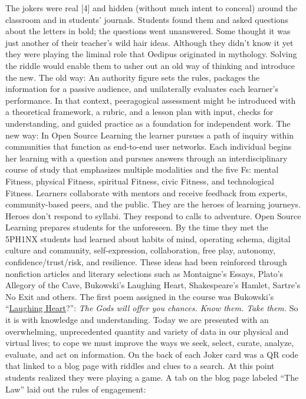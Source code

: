 The jokers were real {[}4{]} and hidden (without much intent to conceal)
around the classroom and in students' journals. Students found them and
asked questions about the letters in bold; the questions went
unanswered. Some thought it was just another of their teacher's wild
hair ideas. Although they didn't know it yet they were playing the
liminal role that Oedipus originated in mythology. Solving the riddle
would enable them to usher out an old way of thinking and introduce the
new. The old way: An authority figure sets the rules, packages the
information for a passive audience, and unilaterally evaluates each
learner's performance. In that context, peeragogical assessment might be
introduced with a theoretical framework, a rubric, and a lesson plan
with input, checks for understanding, and guided practice as a
foundation for independent work. The new way: In Open Source Learning
the learner pursues a path of inquiry within communities that function
as end-to-end user networks. Each individual begins her learning with a
question and pursues answers through an interdisciplinary course of
study that emphasizes multiple modalities and the five Fs: mental
Fitness, physical Fitness, spiritual Fitness, civic Fitness, and
technological Fitness. Learners collaborate with mentors and receive
feedback from experts, community-based peers, and the public. They are
the heroes of learning journeys. Heroes don't respond to syllabi. They
respond to calls to adventure. Open Source Learning prepares students
for the unforeseen. By the time they met the 5PH1NX students had learned
about habits of mind, operating schema, digital culture and community,
self-expression, collaboration, free play, autonomy,
confidence/trust/risk, and resilience. These ideas had been reinforced
through nonfiction articles and literary selections such as Montaigne's
Essays, Plato's Allegory of the Cave, Bukowski's Laughing Heart,
Shakespeare's Hamlet, Sartre's No Exit and others. The first poem
assigned in the course was Bukowski's
``\href{http://www.youtube.com/watch?v=bHOHi5ueo0A}{Laughing Heart}?'':
\emph{The Gods will offer you chances. Know them. Take them.} So it is
with knowledge and understanding. Today we are presented with an
overwhelming, unprecedented quantity and variety of data in our physical
and virtual lives; to cope we must improve the ways we seek, select,
curate, analyze, evaluate, and act on information. On the back of each
Joker card was a QR code that linked to a blog page with riddles and
clues to a search. At this point students realized they were playing a
game. A tab on the blog page labeled ``The Law'' laid out the rules of
engagement:

